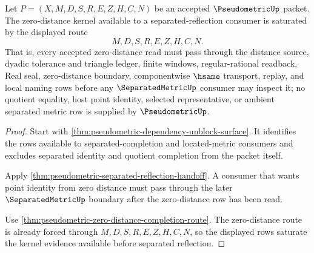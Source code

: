 \begin{theorem}
\label{thm:pseudometric-separated-reflection-kernel-saturation}
Let $P=(X,M,D,S,R,E,Z,H,C,N)$ be an accepted $\PseudometricUp$ packet. The zero-distance kernel available to a separated-reflection consumer is saturated by the displayed route
$$
M,D,S,R,E,Z,H,C,N.
$$
That is, every accepted zero-distance read must pass through the distance source, dyadic tolerance and triangle ledger, finite windows, regular-rational readback, Real seal, zero-distance boundary, componentwise $\hsame$ transport, replay, and local naming rows before any $\SeparatedMetricUp$ consumer may inspect it; no quotient equality, host point identity, selected representative, or ambient separated metric row is supplied by $\PseudometricUp$.
\end{theorem}
\begin{proof}
Start with \autoref{thm:pseudometric-dependency-unblock-surface}. It identifies the rows available to separated-completion and located-metric consumers and excludes separated identity and quotient completion from the packet itself.

Apply \autoref{thm:pseudometric-separated-reflection-handoff}. A consumer that wants point identity from zero distance must pass through the later $\SeparatedMetricUp$ boundary after the zero-distance row has been read.

Use \autoref{thm:pseudometric-zero-distance-completion-route}. The zero-distance route is already forced through $M,D,S,R,E,Z,H,C,N$, so the displayed rows saturate the kernel evidence available before separated reflection.
\end{proof}

